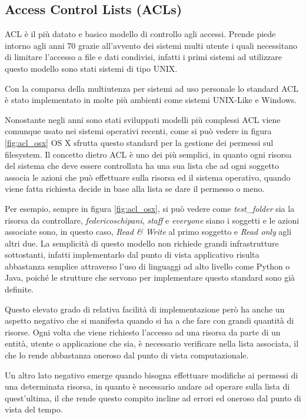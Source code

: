 \subsection*{Access Control Lists (ACLs)}
\label{sub:ACL}

ACL è il più datato e basico modello di controllo agli accessi. Prende piede intorno agli anni 70
grazie all'avvento dei sistemi multi utente i quali necessitano di limitare l'accesso a file e dati condivisi, infatti i primi sistemi ad utilizzare questo modello sono stati sistemi di tipo UNIX.\\ \par
Con la comparsa della multiutenza per sistemi ad uso personale lo standard ACL è stato implementato in molte più ambienti come sistemi UNIX-Like e Windows.\\ \par

Nonostante negli anni sono stati sviluppati modelli più complessi ACL viene comunque usato nei sistemi operativi recenti, come si può vedere in figura \ref{fig:acl_osx} OS X sfrutta questo standard per la gestione dei permessi sul filesystem.
Il concetto dietro ACL è uno dei più semplici, in quanto ogni risorsa del sistema che deve essere controllata ha una sua lista che ad ogni soggetto associa le azioni che può effettuare sulla risorsa ed il sistema operativo, quando viene fatta richiesta decide in base alla lista se dare il permesso o meno.\\ \par
Per esempio, sempre in figura \ref{fig:acl_osx}, si può vedere come \textit{test\_folder} sia la risorsa da controllare, \textit{federicoschipani}, \textit{staff} e \textit{everyone} siano i soggetti e le azioni associate sono, in questo caso, \textit{Read \& Write} al primo soggetto e \textit{Read only} agli altri due.
La semplicità di questo modello non richiede grandi infrastrutture sottostanti, infatti implementarlo dal punto di vista applicativo risulta abbastanza semplice attraverso l'uso di linguaggi ad alto livello come Python o Java, poiché le strutture che servono per implementare questo standard sono già definite.\\ \par
Questo elevato grado di relativa facilità di implementazione però ha anche un aspetto negativo che si manifesta quando si ha a che fare con grandi quantità di risorse. Ogni volta che viene richiesto l'accesso ad una risorsa da parte di un entità, utente o applicazione che sia, è necessario verificare nella lista associata, il che lo rende abbastanza oneroso dal punto di vista computazionale.\\ \par
Un altro lato negativo emerge quando bisogna effettuare modifiche ai permessi di una determinata risorsa, in quanto è necessario andare ad operare sulla lista di quest'ultima, il che rende questo compito incline ad errori ed oneroso dal punto di vista del tempo.


